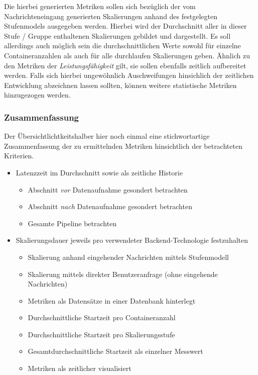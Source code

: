 Die hierbei generierten Metriken sollen sich bezüglich der vom Nachrichteneingang generierten Skalierungen anhand des festgelegten Stufenmodels ausgegeben werden. Hierbei wird der Durchschnitt aller in dieser Stufe / Gruppe enthaltenen Skalierungen gebildet und dargestellt. Es soll allerdings auch möglich sein die durchschnittlichen Werte sowohl für einzelne Containeranzahlen als auch für alle durchlaufen Skalierungen geben. Ähnlich zu den Metriken der \emph{Leistungsfähigkeit} gilt, sie sollen ebenfalls zeitlich aufbereitet werden. Falls sich hierbei ungewöhnlich Auschweifungen hinsichlich der zeitlichen Entwicklung abzeichnen lassen sollten, können weitere statistische Metriken hinzugezogen werden. 



\subsubsection{Zusammenfassung}
Der Übersichtlichtkeitshalber hier noch einmal eine stichwortartige Zusammenfassung der zu ermittelnden Metriken hinsichtlich der betrachteten Kriterien.

\begin{itemize}
  \item Latenzzeit im Durchschnitt sowie als zeitliche Historie
  \begin{itemize}
    \item Abschnitt \emph{vor} Datenaufnahme gesondert betrachten
    \item Abschnitt \emph{nach} Datenaufnahme gesondert betrachten
    \item Gesamte Pipeline betrachten
  \end{itemize}
  \item Skalierungsdauer jeweils pro verwendeter Backend-Technologie festzuhalten
  \begin{itemize}
    \item Skalierung anhand eingehender Nachrichten mittels Stufenmodell
    \item Skalierung mittels direkter Benutzeranfrage (ohne eingehende Nachrichten)
    \item Metriken als Datensätze in einer Datenbank hinterlegt
    \item Durchschnittliche Startzeit pro Containeranzahl 
    \item Durchschnittliche Startzeit pro Skalierungsstufe 
    \item Gesamtdurchschnittliche Startzeit als einzelner Messwert
    \item Metriken als zeitlicher visualisiert
  \end{itemize}
\end{itemize}